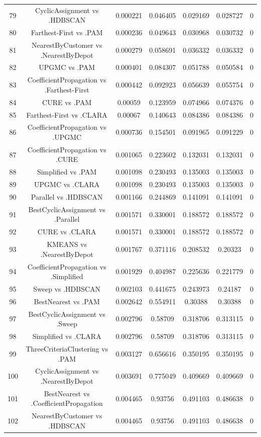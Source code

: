 \documentclass[a4paper,10pt]{article}
\begin{document}
\begin{landscape}
\begin{table}[!htp]
\begin{tabular}{ccccccc}
79&CyclicAssignment vs .HDBSCAN&0.000221&0.046405&0.029169&0.028727&0\\
80&Farthest-First vs .PAM&0.000236&0.049643&0.030968&0.030732&0\\
81&NearestByCustomer vs .NearestByDepot&0.000279&0.058691&0.036332&0.036332&0\\
82&UPGMC vs .PAM&0.000401&0.084307&0.051788&0.050584&0\\
83&CoefficientPropagation vs .Farthest-First&0.000442&0.092923&0.056639&0.055754&0\\
84&CURE vs .PAM&0.00059&0.123959&0.074966&0.074376&0\\
85&Farthest-First vs .CLARA&0.00067&0.140643&0.084386&0.084386&0\\
86&CoefficientPropagation vs .UPGMC&0.000736&0.154501&0.091965&0.091229&0\\
87&CoefficientPropagation vs .CURE&0.001065&0.223602&0.132031&0.132031&0\\
88&Simplified vs .PAM&0.001098&0.230493&0.135003&0.135003&0\\
89&UPGMC vs .CLARA&0.001098&0.230493&0.135003&0.135003&0\\
90&Parallel vs .HDBSCAN&0.001166&0.244869&0.141091&0.141091&0\\
91&BestCyclicAssignment vs .Parallel&0.001571&0.330001&0.188572&0.188572&0\\
92&CURE vs .CLARA&0.001571&0.330001&0.188572&0.188572&0\\
93&KMEANS vs .NearestByDepot&0.001767&0.371116&0.208532&0.20323&0\\
94&CoefficientPropagation vs .Simplified&0.001929&0.404987&0.225636&0.221779&0\\
95&Sweep vs .HDBSCAN&0.002103&0.441675&0.243973&0.24187&0\\
96&BestNearest vs .PAM&0.002642&0.554911&0.30388&0.30388&0\\
97&BestCyclicAssignment vs .Sweep&0.002796&0.58709&0.318706&0.313115&0\\
98&Simplified vs .CLARA&0.002796&0.58709&0.318706&0.313115&0\\
99&ThreeCriteriaClustering vs .PAM&0.003127&0.656616&0.350195&0.350195&0\\
100&CyclicAssignment vs .NearestByDepot&0.003691&0.775049&0.409669&0.409669&0\\
101&BestNearest vs .CoefficientPropagation&0.004465&0.93756&0.491103&0.486638&0\\
102&NearestByCustomer vs .HDBSCAN&0.004465&0.93756&0.491103&0.486638&0\\

\end{tabular}
\end{table}
\end{landscape}
\end{document}
